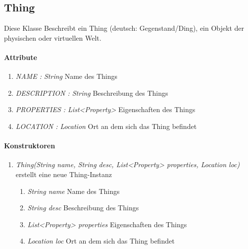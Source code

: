 \subsection{Thing}
Diese Klasse Beschreibt ein Thing (deutsch: Gegenstand/Ding), ein Objekt der physischen oder virtuellen Welt.

\paragraph{Attribute}
\begin{enumerate}[$\bullet$]
	\item \textit{NAME : String} Name des Things
	\item \textit{DESCRIPTION : String} Beschreibung des Things
	\item \textit{PROPERTIES : List<Property>} Eigenschaften des Things
	\item \textit{LOCATION : Location} Ort an dem sich das Thing befindet
\end{enumerate}

\paragraph{Konstruktoren}
\begin{enumerate}[+]
	\item \textit{Thing(String name, String desc, List<Property> properties, Location loc)}
	erstellt eine neue Thing-Instanz
	\begin{enumerate}[$\bullet$]
		\item \textit{String name} Name des Things
		\item \textit{String desc} Beschreibung des Things
		\item \textit{List<Property> properties} Eigenschaften des Things
		\item \textit{Location loc} Ort an dem sich das Thing befindet
	\end{enumerate}
	
\end{enumerate}
